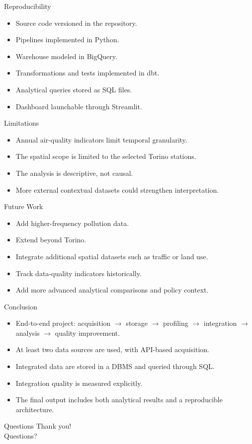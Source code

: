 \documentclass[aspectratio=169]{beamer}
\begin{document}
\begin{frame}{Reproducibility}
\begin{itemize}
  \item Source code versioned in the repository.
  \item Pipelines implemented in Python.
  \item Warehouse modeled in BigQuery.
  \item Transformations and tests implemented in dbt.
  \item Analytical queries stored as SQL files.
  \item Dashboard launchable through Streamlit.
\end{itemize}
\end{frame}

\begin{frame}{Limitations}
\begin{itemize}
  \item Annual air-quality indicators limit temporal granularity.
  \item The spatial scope is limited to the selected Torino stations.
  \item The analysis is descriptive, not causal.
  \item More external contextual datasets could strengthen interpretation.
\end{itemize}
\end{frame}

\begin{frame}{Future Work}
\begin{itemize}
  \item Add higher-frequency pollution data.
  \item Extend beyond Torino.
  \item Integrate additional spatial datasets such as traffic or land use.
  \item Track data-quality indicators historically.
  \item Add more advanced analytical comparisons and policy context.
\end{itemize}
\end{frame}

\begin{frame}{Conclusion}
\begin{itemize}
  \item End-to-end project: acquisition $\rightarrow$ storage $\rightarrow$ profiling $\rightarrow$ integration $\rightarrow$ analysis $\rightarrow$ quality improvement.
  \item At least two data sources are used, with API-based acquisition.
  \item Integrated data are stored in a DBMS and queried through SQL.
  \item Integration quality is measured explicitly.
  \item The final output includes both analytical results and a reproducible architecture.
\end{itemize}
\end{frame}

\begin{frame}{Questions}
\centering
\Huge Thank you!\\[0.5cm]
\Large Questions?
\end{frame}
\end{document}

